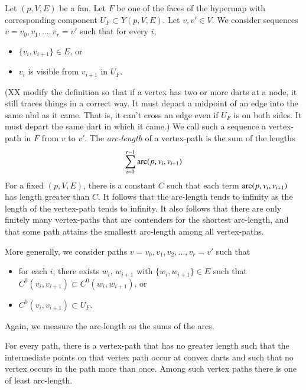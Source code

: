 Let $(p,V,E)$ be a fan.   
Let $F$ be one of the faces of the
hypermap with corresponding component $U_F\subset Y(p,V,E)$.
Let $v,v'\in V$.    We consider sequences
$v=v_0,v_1,\ldots,v_r=v'$ such that for every $i$,
\begin{itemize}
  \item $\{v_i,v_{i+1}\} \in E$, or
  \item $v_i$ is visible from $v_{i+1}$ in $U_F$.
\end{itemize}
(XX modify the definition so that if a vertex has two or more darts
at a node, it still traces things in a correct way. It must depart
a midpoint of an edge into the same nbd as it came. That is, it
can't cross an edge even if $U_F$ is on both sides.  It must depart
the same dart in which it came.)
We call such a sequence a vertex-path in $F$ from $v$ to $v'$.
The {\it arc-length} of a vertex-path is the sum of the lengths
$$
\sum_{i=0}^{r-1}\operatorname{arc}(p,v_i,v_{i+1})
$$
For a fixed $(p,V,E)$, there is a constant $C$ such that
each term $\operatorname{arc}(p,v_i,v_{i+1})$ has length greater than $C$.  It
follows that the arc-length tends to infinity as the length of
the vertex-path tends to infinity.  It also follows that there are only
finitely many vertex-paths that are contenders for the shortest arc-length,
and that some path attains the smallestt arc-length among all vertex-paths.

More generally, we consider paths
$v=v_0,v_1,v_2,\ldots,v_r=v'$ such that 
\begin{itemize}
\item for each $i$, there exists $w_i$, $w_{i+1}$ with $\{w_i,w_{i+1}\}\in E$
such that $C^0(v_i,v_{i+1})\subset C^0(w_i,w_{i+1})$, or
\item $C^0(v_i,v_{i+1})\subset U_F$.
\end{itemize}
Again, we measure the arc-length as the sums of the arcs.

\begin{lemma}
For every path, there is a vertex-path that has no greater length
such that the intermediate points on that vertex path occur at convex darts
and such that no vertex occurs in the path more than once.
Among such vertex paths there is one of least arc-length.
\end{lemma}


